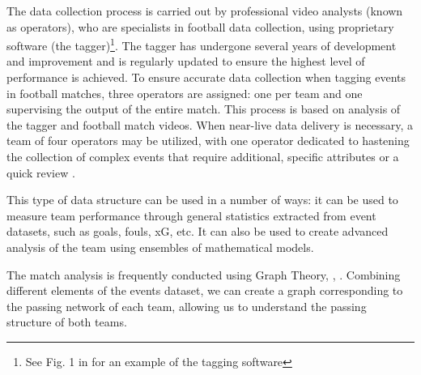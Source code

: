 \documentclass[
  10pt,
  twoside,nohyper]{book}
\begin{document}
The data collection process is carried out by professional video
analysts (known as operators), who are specialists in football data
collection, using proprietary software (the tagger)\footnote{See Fig. 1 in \citep{3} for an example of the tagging software}. The tagger has
undergone several years of development and improvement and is regularly
updated to ensure the highest level of performance is achieved. To
ensure accurate data collection when tagging events in football matches,
three operators are assigned: one per team and one supervising the
output of the entire match. This process is based on analysis of the
tagger and football match videos. When near-live data delivery is
necessary, a team of four operators may be utilized, with one operator
dedicated to hastening the collection of complex events that require
additional, specific attributes or a quick review \citep{3}.

\begin{table}[!h]
\centering
\caption{\label{tab:event}Example of an events dataset of a game.}
\centering
{}
\end{table}

This type of data structure can be used in a number of ways: it can be
used to measure team performance through general statistics extracted
from event datasets, such as goals, fouls, xG, etc. It can also be used to create advanced analysis of the team using ensembles of mathematical models.

The match analysis is frequently conducted using Graph Theory, \citep{Buldu}, \citep{NOVILLO2024114355}. Combining
different elements of the events dataset, we can create a graph
corresponding to the passing network of each team, allowing us to
understand the passing structure of both teams.
\end{document}
